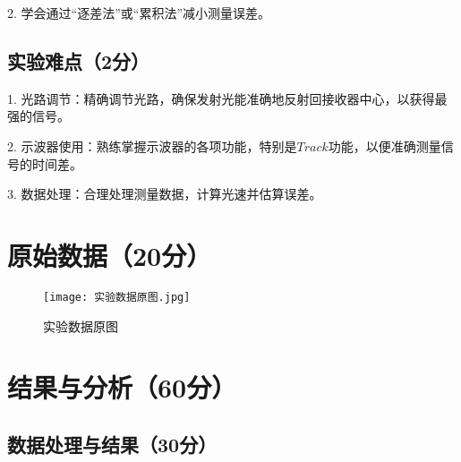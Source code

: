 \documentclass{Phyport}
\begin{document}
2. 学会通过“逐差法”或“累积法”减小测量误差。

\subsection{实验难点（2分）}
1. 光路调节：精确调节光路，确保发射光能准确地反射回接收器中心，以获得最强的信号。

2. 示波器使用：熟练掌握示波器的各项功能，特别是$Track$功能，以便准确测量信号的时间差。

3. 数据处理：合理处理测量数据，计算光速并估算误差。

\newpage


\section{原始数据（20分）}
\begin{figure}[H]
    \centering
    \texttt{[image: 实验数据原图.jpg]}
    \caption{实验数据原图}
    \label{fig:原始数据1}
\end{figure}


\section{结果与分析（60分）}
\subsection{数据处理与结果（30分）}
\end{document}

